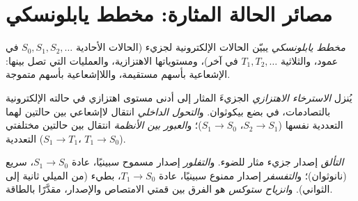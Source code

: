 \section{مصائر الحالة المثارة: مخطط يابلونسكي}

\begin{definition}\label{def:b3:electronic-spectroscopy:jablonski}
\emph{مخطط يابلونسكي} يبيّن الحالات الإلكترونية
لجزيء (الحالات الأحادية $S_0, S_1, S_2, \dots$ في عمود، والثلاثية $T_1, T_2,
\dots$ في آخر)، ومستوياتها الاهتزازية، والعمليات التي تصل بينها:
الإشعاعية بأسهم مستقيمة، واللاإشعاعية بأسهم متموجة.
\end{definition}

\begin{definition}\label{def:b3:electronic-spectroscopy:radiationless}
يُنزل \emph{الاسترخاء الاهتزازي} الجزيءَ المثار
إلى أدنى مستوى اهتزازي في حالته الإلكترونية بالتصادمات،
في بضع بيكوثوان. و\emph{التحول الداخلي}
انتقال لاإشعاعي بين حالتين لهما
التعددية نفسها ($S_2 \to S_1$، $S_1 \to S_0$)؛ و\emph{العبور بين
الأنظمة} انتقال بين حالتين مختلفتي
التعددية ($S_1 \to T_1$، $T_1 \to S_0$).
\end{definition}

\begin{definition}\label{def:b3:electronic-spectroscopy:luminescence}
\emph{التألق} إصدار جزيء مثار
للضوء. و\emph{التفلور} إصدار مسموح سبينيًا،
عادة $S_1 \to S_0$، سريع (نانوثوان)؛ و\emph{التفسفر}
إصدار ممنوع سبينيًا، عادة $T_1 \to S_0$، بطيء (من الميلي ثانية إلى
الثواني). و\emph{انزياح ستوكس} هو الفرق بين
قمتي الامتصاص والإصدار، مقدَّرًا بالطاقة.
\end{definition}

